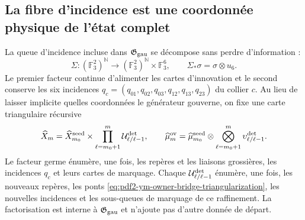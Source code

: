 \subsection{La fibre d’incidence est une coordonnée physique de l’état complet}

La queue d’incidence incluse dans $\mathfrak G_{\rm gau}$ se décompose sans perdre
d’information :
\begin{equation}\label{eq:pdf2-ym-owner-seed-split}
 \Sigma:(\mathbb F_3^2)^{\mathbb N}\longrightarrow
 (\mathbb F_3^2)^{\mathbb N}\times\mathbb F_3^6,
 \qquad \Sigma_*\sigma=\sigma\otimes u_6.
\end{equation}
Le premier facteur continue d’alimenter les cartes d’innovation et le second conserve
les six incidences $q_c=(q_{01},q_{02},q_{03},q_{12},q_{13},q_{23})$ du collier
$c$. Au lieu de laisser implicite quelles coordonnées le générateur gouverne, on fixe une
carte triangulaire récursive
\begin{equation}\label{eq:pdf2-ym-owner-product-factorization}
 \widehat X_m
 =\widehat X_{m_0}^{\rm seed}
  \times\prod_{\ell=m_0+1}^{m}
       \mathcal U_{\ell/\ell-1}^{\rm det},
 \qquad
 \widehat\mu_m^{\rm ov}
 =\widehat\mu_{m_0}^{\rm seed}
  \otimes\bigotimes_{\ell=m_0+1}^{m}
       \upsilon_{\ell/\ell-1}^{\rm det}.
\end{equation}
Le facteur germe énumère, une fois, les repères et les liaisons grossières, les incidences $q_c$ et leurs cartes de marquage. Chaque $\mathcal U_{\ell/\ell-1}^{\rm det}$ énumère, une fois, les nouveaux repères, les ponts \eqref{eq:pdf2-ym-owner-bridge-triangularization}, les nouvelles incidences et les sous-queues de marquage de ce raffinement. La factorisation est interne à $\mathfrak G_{\rm gau}$ et n'ajoute pas d'autre donnée de départ.

